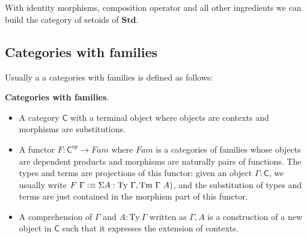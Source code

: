 \begin{code}
\\
\>  \AgdaSymbol{(}  \AgdaSymbol{:} \AgdaSymbol{)} \AgdaSymbol{:}  \<%
\\
\>[0]\<[2]%
\>[2]\<%
\\
\>[2]\<[4]%
\>[4] \<[9]%
\>[9]\AgdaSymbol{:}       \<%
\\
\>[2]\<[4]%
\>[4] \AgdaSymbol{:} \AgdaSymbol{\{}  \AgdaSymbol{:}   \AgdaSymbol{\}}  \<[27]%
\>[27]\<%
\\
\>[4]\<[11]%
\>[11]\AgdaFunction{[}  \AgdaFunction{]}     \<[25]%
\>[25]\<%
\\
\>[4]\<[11]%
\>[11]\AgdaFunction{[}  \AgdaFunction{]}     \<%
\\
\end{code}


With identity morphisms, composition operator and all other ingredients we can build the category of setoids of $\textbf{Std}$.


\subsection{Categories with families}

Usually a a categories with families is defined as follows:

\begin{definition}
\textbf{Categories with families}.

\begin{itemize}
\item A category $\mathsf{C}$ with a terminal object where objects are contexts and morphisms are substitutions.

\item A functor $F : \mathsf{C}^{op} \to Fam$ where $Fam$ is a categories of families whose objects are dependent products and morphisms are naturally pairs of functions. The types and terms are projections of this functor: given an object $\Gamma : \mathsf{C}$, we usually write $F ~ \Gamma \vcentcolon\equiv \Sigma A : \text{Ty} ~\Gamma, \text{Tm} ~\Gamma ~ A)$, and the substitution of types and terms are just contained in the morphism part of this functor. 

\item A comprehension of $\Gamma$ and $A : \text{Ty}~ \Gamma$ written as $\Gamma, A$ is a construction of a new object in $\mathsf{C}$ such that it expresses the extension of contexts.
\end{itemize}

\end{definition}

